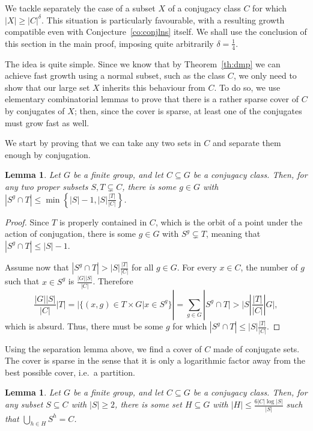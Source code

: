 \documentclass[a4paper]{article}
\newtheorem{lemma}[proposition]{Lemma}
\theoremstyle{definition}
\numberwithin{equation}{section}
\begin{document}
We tackle separately the case of a subset $X$ of a conjugacy class $C$ for which $|X|\geq|C|^{\delta}$. This situation is particularly favourable, with a resulting growth compatible even with Conjecture~\ref{co:conjlns} itself. We shall use the conclusion of this section in the main proof, imposing quite arbitrarily $\delta=\frac{1}{4}$.

The idea is quite simple. Since we know that by Theorem~\ref{th:dmp} we can achieve fast growth using a normal subset, such as the class $C$, we only need to show that our large set $X$ inherits this behaviour from $C$. To do so, we use elementary combinatorial lemmas to prove that there is a rather sparse cover of $C$ by conjugates of $X$; then, since the cover is sparse, at least one of the conjugates must grow fast as well.

We start by proving that we can take any two sets in $C$ and separate them enough by conjugation.

\begin{lemma}\label{le:piececl}
Let $G$ be a finite group, and let $C\subseteq G$ be a conjugacy class. Then, for any two proper subsets $S,T\subsetneq C$, there is some $g\in G$ with $|S^{g}\cap T|\leq\min\left\{|S|-1,|S|\frac{|T|}{|C|}\right\}$.
\end{lemma}

\begin{proof}
Since $T$ is properly contained in $C$, which is the orbit of a point under the action of conjugation, there is some $g\in G$ with $S^{g}\subsetneq T$, meaning that $|S^{g}\cap T|\leq|S|-1$.

Assume now that $|S^{g}\cap T|>|S|\frac{|T|}{|C|}$ for all $g\in G$. For every $x\in C$, the number of $g$ such that $x\in S^{g}$ is $\frac{|G||S|}{|C|}$. Therefore
\begin{equation*}
\frac{|G||S|}{|C|}|T|=|\{(x,g)\in T\times G|x\in S^{g}\}|=\sum_{g\in G}|S^{g}\cap T|>|S|\frac{|T|}{|C|}|G|,
\end{equation*}
which is absurd. Thus, there must be some $g$ for which $|S^{g}\cap T|\leq|S|\frac{|T|}{|C|}$.
\end{proof}

Using the separation lemma above, we find a cover of $C$ made of conjugate sets. The cover is sparse in the sense that it is only a logarithmic factor away from the best possible cover, i.e.\ a partition.

\begin{lemma}\label{le:covercl}
Let $G$ be a finite group, and let $C\subseteq G$ be a conjugacy class. Then, for any subset $S\subseteq C$ with $|S|\geq 2$, there is some set $H\subseteq G$ with $|H|\leq\frac{6|C|\log|S|}{|S|}$ such that $\bigcup_{h\in H}S^{h}=C$.
\end{lemma}
\end{document}
